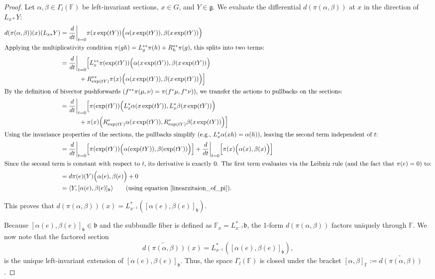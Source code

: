 \documentclass[11pt,reqno]{amsart}
\theoremstyle{definition}
\numberwithin{equation}{section}
\begin{document}
\begin{proof}
Let $\alpha, \beta \in \Gamma_l(\mathbb{F})$ be left-invariant sections, $x \in G$, and $Y \in \mathfrak{g}$. We evaluate the differential $d(\pi(\alpha, \beta))$ at $x$ in the direction of $L_{x*}Y$:
\begin{align*}
d(\pi(\alpha, \beta))(x)(L_{x*}Y) &= \frac{d}{dt}\bigg|_{t=0} \pi(x \exp(tY)) \Big( \alpha(x \exp(tY)), \beta(x \exp(tY)) \Big) \\
\intertext{Applying the multiplicativity condition $\pi(gh) = L_{g}^{**}\pi(h) + R_{h}^{**}\pi(g)$, this splits into two terms:}
&= \frac{d}{dt}\bigg|_{t=0} \Big[ L_{x}^{**}\pi(\exp(tY)) \Big( \alpha(x \exp(tY)), \beta(x \exp(tY)) \Big) \\
&\qquad\quad + R_{\exp(tY)}^{**}\pi(x) \Big( \alpha(x \exp(tY)), \beta(x \exp(tY)) \Big) \Big] \\
\intertext{By the definition of bivector pushforwards ($f^{**}\pi(\mu, \nu) = \pi(f^*\mu, f^*\nu)$), we transfer the actions to pullbacks on the sections:}
&= \frac{d}{dt}\bigg|_{t=0} \Big[ \pi(\exp(tY)) \Big( L_{x}^*\alpha(x \exp(tY)), L_{x}^*\beta(x \exp(tY)) \Big) \\
&\qquad\quad + \pi(x) \Big( R_{\exp(tY)}^*\alpha(x \exp(tY)), R_{\exp(tY)}^*\beta(x \exp(tY)) \Big) \Big] \\
\intertext{Using the invariance properties of the sections, the pullbacks simplify (e.g., $L_x^*\alpha(xh) = \alpha(h)$), leaving the second term independent of $t$:}
&= \frac{d}{dt}\bigg|_{t=0} \Big[ \pi(\exp(tY)) \Big( \alpha(\exp(tY)), \beta(\exp(tY)) \Big) \Big] + \frac{d}{dt}\bigg|_{t=0} \Big[ \pi(x) \Big( \alpha(x), \beta(x) \Big) \Big] \\
\intertext{Since the second term is constant with respect to $t$, its derivative is exactly $0$. The first term evaluates via the Leibniz rule (and the fact that $\pi(e)=0$) to:}
&= d\pi(e)(Y) \Big( \alpha(e), \beta(e) \Big) + 0 \\
&= \langle Y, [\alpha(e), \beta(e)]_{\mathfrak{b}} \rangle \qquad\text{(using equation \ref{linearzitaion_of_pi})}.
\end{align*}

This proves that $d(\pi(\alpha, \beta))(x) = L_{x^{-1}}^* \left( [\alpha(e), \beta(e)]_{\mathfrak{b}} \right)$. 

Because $[\alpha(e), \beta(e)]_{\mathfrak{b}} \in \mathfrak{b}$ and the subbundle fiber is defined as $\mathbb{F}_x = L_{x^{-1}}^*\mathfrak{b}$, the 1-form $d(\pi(\alpha, \beta))$ factors uniquely through $\mathbb{F}$. We now note that the factored section
\[
\widetilde{d(\pi(\alpha, \beta))}(x) = L_{x^{-1}}^* \left( [\alpha(e), \beta(e)]_{\mathfrak{b}} \right),
\]
is the unique left-invariant extension of $[\alpha(e), \beta(e)]_{\mathfrak{b}}$. Thus, the space $\Gamma_l(\mathbb{F})$ is closed under the bracket $[\alpha, \beta]_{\mathbb{F}} := \widetilde{d(\pi(\alpha, \beta))}$.


\end{proof}
\end{document}
